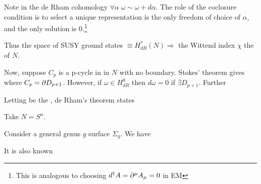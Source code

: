 \documentclass{article}
\begin{document}
Note in the de Rham cohomology $\forall \alpha \; \omega \sim \omega + d\alpha$. The role of the coclosure condition is to select a unique representation 
is the only freedom of choice of $\alpha$, and the only solution is 0.\footnote{This is analogous to choosing $d^\dagger A = \partial^\mu A_\mu = 0 $ in EM }

Thus the space of SUSY ground states $\cong H_{dR}^\ast (N) \Rightarrow$ the Wittend index 
$\chi$ the  of $N$. 

Now, suppose $C_p$ is a p-cycle in in $N$ with no boundary. Stokes' theorem gives 
where $C_p = \partial D_{p+1}$. However, if $\omega \in H_{dR}^0$ then $d\omega = 0$ 
if $\exists D_{p+1}$. Further 

\begin{theorem}
Letting 
be the , de Rham's theorem states 
\end{theorem}

\begin{example}
Take $N= S^n$. 
\end{example}

Consider a general genus $g$ surface $\Sigma_g$. We have 

It is also known 
\end{document}
